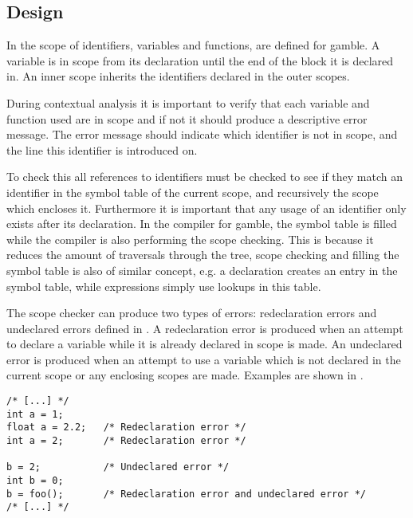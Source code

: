 \subsection*{Design}
In  the scope of identifiers, variables and functions, are defined for \gls{gamble}.
A variable is in scope from its declaration until the end of the block it is declared in.
An inner scope inherits the identifiers declared in the outer scopes. 

During contextual analysis it is important to verify that each variable and function used are in scope and if not it should produce a descriptive error message.
The error message should indicate which identifier is not in scope, and the line this identifier is introduced on.

To check this all references to identifiers must be checked to see if they match an identifier in the symbol table of the current scope, and recursively the scope which encloses it. 
Furthermore it is important that any usage of an identifier only exists after its declaration.
In the compiler for \gls{gamble}, the symbol table is filled while the compiler is also performing the scope checking.
This is because it reduces the amount of traversals through the tree, scope checking and filling the symbol table is also of similar concept, e.g. a declaration creates an entry in the symbol table, while expressions simply use lookups in this table.

The scope checker can produce two types of errors: redeclaration errors and undeclared errors defined in .
A redeclaration error is produced when an attempt to declare a variable while it is already declared in scope is made.
An undeclared error is produced when an attempt to use a variable which is not declared in the current scope or any enclosing scopes are made. 
Examples are shown in .

\begin{lstlisting}[caption=Examples of scope errors in \gls{gamble}, numbers=none,frame=tlrb,label={lst:scopeErrors}]
/* [...] */
int a = 1;
float a = 2.2;   /* Redeclaration error */
int a = 2;       /* Redeclaration error */ 

b = 2;           /* Undeclared error */   
int b = 0;
b = foo();       /* Redeclaration error and undeclared error */ 
/* [...] */
\end{lstlisting}

